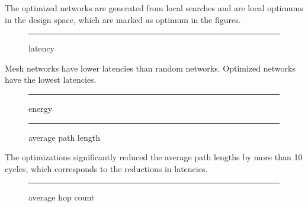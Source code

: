 \documentclass[12pt]{article}
\theoremstyle{definition}
\begin{document}
The optimized networks are generated from local searches and are local optimums in the design space, which are marked as optimum in the figures.
\begin{figure}[htb]
  \begin{subfigure} {\texttt{[image: latency\_benchmark]}} \end{subfigure}
  \rule{\linewidth}{1pt} \caption{latency}
\end{figure}

Mesh networks have lower latencies than random networks. Optimized networks have the lowest latencies.
\begin{figure}[htb]
  \begin{subfigure} {\texttt{[image: energy\_benchmark]}} \end{subfigure}
  \rule{\linewidth}{1pt} \caption{energy} \label{fig:energy_benchmark}
\end{figure}

\begin{figure}[htb]
  \begin{subfigure} {\texttt{[image: average\_path\_length\_benchmark.png]}} \end{subfigure}
  \rule{\linewidth}{1pt} \caption{average path length} \label{fig:average_path_length_benchmark}
\end{figure}

The optimizations significantly reduced the average path lengths by more than 10 cycles, which corresponds to the reductions in latencies.
\begin{figure}[htb]
  \begin{subfigure} {\texttt{[image: average\_hop\_count\_benchmark.png]}} \end{subfigure}
  \rule{\linewidth}{1pt} \caption{average hop count} \label{fig:average_hop_count_benchmark}
\end{figure}
\end{document}
